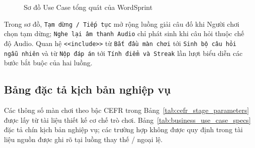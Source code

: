 \begin{figure}[!ht]
{%
    }
    \caption{Sơ đồ Use Case tổng quát của WordSprint}
    \label{fig:use_case_diagram}
\end{figure}

Trong sơ đồ, \texttt{Tạm dừng / Tiếp tục} mở rộng luồng giải câu đố khi Người chơi chọn tạm dừng; \texttt{Nghe lại âm thanh Audio} chỉ phát sinh khi câu hỏi thuộc chế độ Audio. Quan hệ \texttt{<<include>>} từ \texttt{Bắt đầu màn chơi} tới \texttt{Sinh bộ câu hỏi ngẫu nhiên} và từ \texttt{Nộp đáp án} tới \texttt{Tính điểm và Streak} lần lượt biểu diễn các bước bắt buộc của hai luồng.

\subsection{Bảng đặc tả kịch bản nghiệp vụ}
\label{subsec:business_use_case_specs}
Các thông số màn chơi theo bậc CEFR trong Bảng~\ref{tab:cefr_stage_parameters} được lấy từ tài liệu thiết kế cơ chế trò chơi. Bảng~\ref{tab:business_use_case_specs} đặc tả chín kịch bản nghiệp vụ; các trường hợp không được quy định trong tài liệu nguồn được ghi rõ tại luồng thay thế / ngoại lệ.

